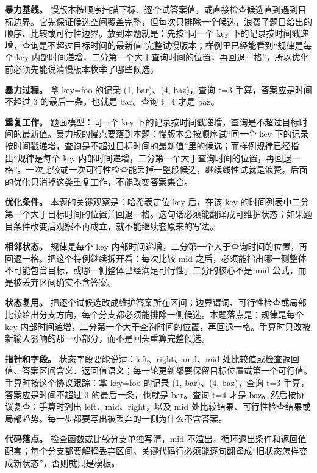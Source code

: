 \textbf{暴力基线。} 慢版本按顺序扫描下标、逐个试答案值，或直接检查候选直到遇到目标边界。它先保证候选空间覆盖完整，但每次只排除一个候选，浪费了题目给出的顺序、比较或可行性边界。放到本题就是：先按“同一个 key 下的记录按时间戳递增，查询是不超过目标时间的最新值”完整试慢版本；样例里已经能看到“规律是每个 key 内部时间递增，二分第一个大于查询时间的位置，再回退一格”，所以优化前必须先能说清慢版本枚举了哪些候选。

\textbf{暴力过程。} 拿 key=foo 的记录 (1, bar)、(4, baz)，查询 t=3 手算，答案应是时间不超过 3 的最后一条，也就是 bar。查询 t=4 才是 baz。

\textbf{重复工作。} 题面模型：同一个 key 下的记录按时间戳递增，查询是不超过目标时间的最新值。暴力版的慢点要落到本题：慢版本会按顺序试“同一个 key 下的记录按时间戳递增，查询是不超过目标时间的最新值”里的候选；而样例规律已经指出“规律是每个 key 内部时间递增，二分第一个大于查询时间的位置，再回退一格”。一次比较或一次可行性检查能丢掉一整段候选，继续线性试就是浪费。后面的优化只消掉这类重复工作，不能改变答案集合。

\textbf{优化条件。} 本题的关键观察是：哈希表定位 key 后，在该 key 的时间列表中二分第一个大于目标时间的位置并回退一格。这句话必须能翻译成可维护状态；如果题目条件改变后观察不再成立，就不能继续套原来的写法。

\textbf{相邻状态。} 规律是每个 key 内部时间递增，二分第一个大于查询时间的位置，再回退一格。把这个特例继续拆开看：每次比较 mid 之后，必须能指出哪一侧整体不可能包含目标，或哪一侧整体已经满足可行性。二分的核心不是 mid 公式，而是被丢弃区间确实不含答案。

\textbf{状态复用。} 把逐个试候选改成维护答案所在区间；边界谓词、可行性检查或局部比较给出分支方向，每个分支都必须能排除一侧候选。本题落点是：规律是每个 key 内部时间递增，二分第一个大于查询时间的位置，再回退一格。手算时只改被新输入影响的那一小部分，而不是回头重算完整候选。

\textbf{指针和字段。} 状态字段要能说清：left、right、mid、mid 处比较值或检查返回值、答案区间含义、返回值语义；每一轮更新都要保留目标位置或第一个可行值。手算时按这个协议跟踪：拿 key=foo 的记录 (1, bar)、(4, baz)，查询 t=3 手算，答案应是时间不超过 3 的最后一条，也就是 bar。查询 t=4 才是 baz。然后按协议复查：手算时列出 left、mid、right，以及 mid 处比较结果、可行性检查结果或局部趋势。每一步都要写出被丢弃的一侧为什么不含答案。

\textbf{代码落点。} 检查函数或比较分支单独写清，mid 不溢出，循环退出条件和返回值配套；每个分支都要解释丢弃区间。关键代码行必须能逐句翻译成“旧状态怎样变成新状态”，否则就只是模板。

